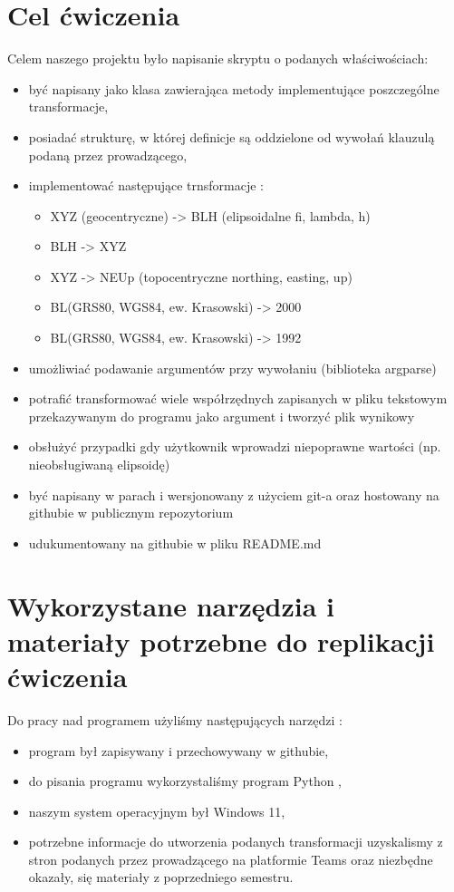 
	\normalsize%
	\section{Cel ćwiczenia}
		Celem naszego projektu było napisanie skryptu o podanych właściwościach:
		\begin{itemize}
			\item być napisany jako klasa zawierająca metody implementujące poszczególne transformacje,
			\item posiadać strukturę, w której definicje są oddzielone od wywołań klauzulą podaną przez prowadzącego,
			\item implementować następujące trnsformacje :
				\begin{itemize}
					\item XYZ (geocentryczne) -> BLH (elipsoidalne fi, lambda, h)
					\item BLH -> XYZ 
					\item XYZ -> NEUp (topocentryczne northing, easting, up) 
					\item BL(GRS80, WGS84, ew. Krasowski) -> 2000
					\item BL(GRS80, WGS84, ew. Krasowski) -> 1992
					
				\end{itemize}
			\item umożliwiać podawanie argumentów przy wywołaniu (biblioteka argparse)
			\item potrafić transformować wiele współrzędnych zapisanych w pliku tekstowym przekazywanym do programu jako argument i tworzyć plik wynikowy
			\item obsłużyć przypadki gdy użytkownik wprowadzi niepoprawne wartości (np. nieobsługiwaną elipsoidę)
			\item być napisany w parach i wersjonowany z użyciem git-a oraz hostowany na githubie w publicznym repozytorium
			\item udukumentowany na githubie w pliku README.md 
		\end{itemize}
				
	
	\section{Wykorzystane narzędzia i materiały potrzebne do replikacji ćwiczenia}

		Do pracy nad programem użyliśmy następujących narzędzi :
			\begin{itemize}
				\item program był zapisywany i przechowywany w githubie,
				\item do pisania programu wykorzystaliśmy program Python ,
				\item naszym system operacyjnym był Windows 11,
				\item potrzebne informacje do utworzenia podanych transformacji uzyskalismy z stron podanych przez prowadzącego na platformie Teams oraz niezbędne okazały, się materiały z poprzedniego semestru.
		\end{itemize}
